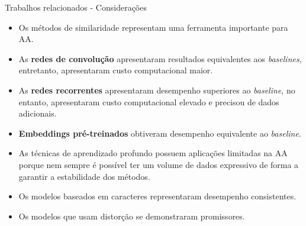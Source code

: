 \begin{frame}{Trabalhos relacionados - Considerações}

\begin{itemize}
	\item Os métodos de similaridade representam uma ferramenta importante para AA.
	\item As {\bf redes de convolução} apresentaram resultados equivalentes aos {\it baselines}, entretanto, apresentaram custo computacional maior.
	\item As {\bf redes recorrentes} apresentaram desempenho superiores ao {\it baseline}, no entanto, apresentaram custo computacional elevado e precisou de dados adicionais.
	\item {\bf Embeddings pré-treinados} obtiveram desempenho equivalente ao {\it baseline}.
	\item As técnicas de aprendizado profundo possuem aplicações limitadas na AA porque nem sempre é possível ter um volume de dados expressivo de forma a garantir a estabilidade dos métodos.
	\item Os modelos baseados em caracteres representaram desempenho consistentes.
	\item Os modelos que usam distorção se demonstraram promissores.
	
\end{itemize}

\end{frame}


